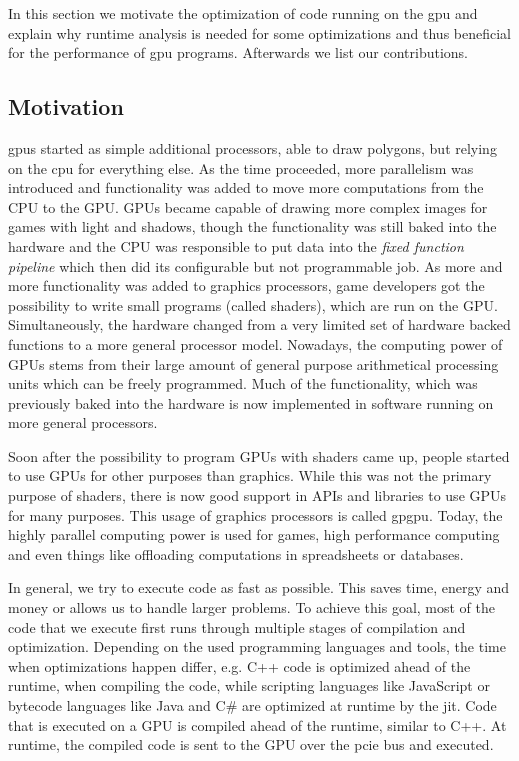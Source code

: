 {}
In this section we motivate the optimization of code running on the \gls{gpu} and explain why runtime analysis is needed for some optimizations and thus beneficial for the performance of \gls{gpu} programs. Afterwards we list our contributions.

\subsection{Motivation}
\label{sub:motivation}
\Glspl{gpu} started as simple additional processors, able to draw polygons, but relying on the \gls{cpu} for everything else. As the time proceeded, more parallelism was introduced and functionality was added to move more computations from the CPU to the GPU. GPUs became capable of drawing more complex images for games with light and shadows, though the functionality was still baked into the hardware and the CPU was responsible to put data into the \emph{fixed function pipeline} which then did its configurable but not programmable job.
As more and more functionality was added to graphics processors, game developers got the possibility to write small programs (called shaders), which are run on the GPU. Simultaneously, the hardware changed from a very limited set of hardware backed functions to a more general processor model. Nowadays, the computing power of GPUs stems from their large amount of general purpose arithmetical processing units which can be freely programmed. Much of the functionality, which was previously baked into the hardware is now implemented in software running on more general processors.~\cite{McClanahan2010}

Soon after the possibility to program GPUs with shaders came up, people started to use GPUs for other purposes than graphics. While this was not the primary purpose of shaders, there is now good support in APIs and libraries to use GPUs for many purposes. This usage of graphics processors is called \gls{gpgpu}. Today, the highly parallel computing power is used for games, high performance computing and even things like offloading computations in spreadsheets or databases.~\cite{Lillqvist2016, Meraji2015}

In general, we try to execute code as fast as possible. This saves time, energy and money or allows us to handle larger problems. To achieve this goal, most of the code that we execute first runs through multiple stages of compilation and optimization. Depending on the used programming languages and tools, the time when optimizations happen differ, e.g. C++ code is optimized ahead of the runtime, when compiling the code, while scripting languages like JavaScript or bytecode languages like Java and C# are optimized at runtime by the \gls{jit}. Code that is executed on a GPU is compiled ahead of the runtime, similar to C++. At runtime, the compiled code is sent to the GPU over the \gls{pcie} bus and executed.


